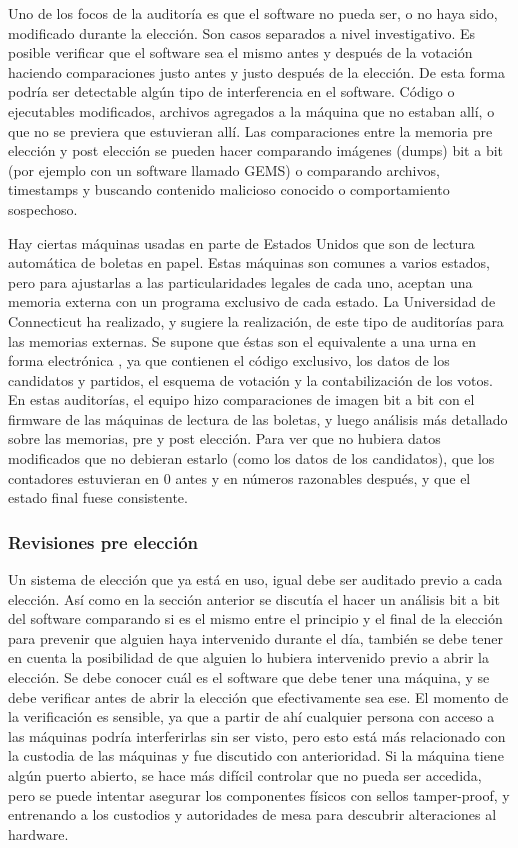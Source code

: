 Uno de los focos de la auditoría es que el software no pueda ser, o no haya sido, modificado durante la elección. Son casos separados a nivel investigativo. Es posible verificar que el software sea el mismo antes y después de la votación haciendo comparaciones justo antes y justo después de la elección. De esta forma podría ser detectable algún tipo de interferencia en el software. Código o ejecutables modificados, archivos agregados a la máquina que no estaban allí, o que no se previera que estuvieran allí. Las comparaciones entre la memoria pre elección y post elección se pueden hacer comparando imágenes (dumps) bit a bit (por ejemplo con un software llamado GEMS) o comparando archivos, timestamps y buscando contenido malicioso conocido o comportamiento sospechoso.

Hay ciertas máquinas usadas en parte de Estados Unidos que son de lectura automática de boletas en papel. Estas máquinas son comunes a varios estados, pero para ajustarlas a las particularidades legales de cada uno, aceptan una memoria externa con un programa exclusivo de cada estado. La Universidad de Connecticut ha realizado, y sugiere la realización, de este tipo de auditorías para las memorias externas. Se supone que éstas son el equivalente a una urna en forma electrónica \cite{preElection}, ya que contienen el código exclusivo, los datos de los candidatos y partidos, el esquema de votación y la contabilización de los votos.
En estas auditorías, el equipo hizo comparaciones de imagen bit a bit con el firmware de las máquinas de lectura de las boletas, y luego análisis más detallado sobre las memorias, pre y post elección. Para ver que no hubiera datos modificados que no debieran estarlo (como los datos de los candidatos), que los contadores estuvieran en 0 antes y en números razonables después, y que el estado final fuese consistente.

\subsubsection{Revisiones pre elección}

Un sistema de elección que ya está en uso, igual debe ser auditado previo a cada elección. Así como en la sección anterior se discutía el hacer un análisis bit a bit del software comparando si es el mismo entre el principio y el final de la elección para prevenir que alguien haya intervenido durante el día, también se debe tener en cuenta la posibilidad de que alguien lo hubiera intervenido previo a abrir la elección. Se debe conocer cuál es el software que debe tener una máquina, y se debe verificar antes de abrir la elección que efectivamente sea ese\cite{holanda}.
El momento de la verificación es sensible, ya que a partir de ahí cualquier persona con acceso a las máquinas podría interferirlas sin ser visto, pero esto está más relacionado con la custodia de las máquinas y fue discutido con anterioridad. Si la máquina tiene algún puerto abierto, se hace más difícil controlar que no pueda ser accedida, pero se puede intentar asegurar los componentes físicos con sellos tamper-proof, y entrenando a los custodios y autoridades de mesa para descubrir alteraciones al hardware.

